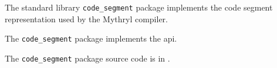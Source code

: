 
The standard library {\tt code\_segment} package implements the code segment representation used by the Mythryl compiler.

The {\tt code\_segment} package implements the  api.

The {\tt code\_segment} package source code is in .




